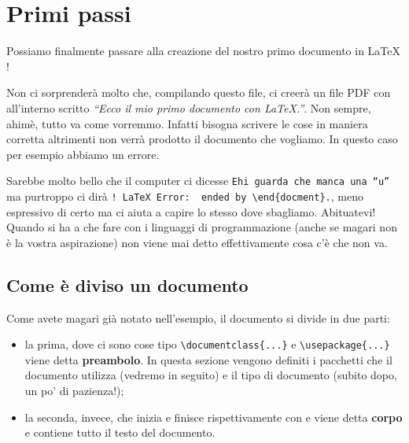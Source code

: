 \chapter{Primi passi}
Possiamo finalmente passare alla creazione del nostro primo documento in \LaTeX{}
!

Non ci sorprenderà molto che, compilando questo file, ci creerà un file PDF con 
all'interno scritto \textit{``Ecco il mio primo documento con \LaTeX{}.''}. Non 
sempre, ahimè, tutto va come vorremmo. Infatti bisogna scrivere le cose in 
maniera corretta altrimenti non verrà prodotto il documento che vogliamo. In 
questo caso per esempio abbiamo un errore.

Sarebbe molto bello che il computer ci dicesse \texttt{Ehi guarda che manca 
una ``u''} ma purtroppo ci dirà 
\verb|! LaTeX Error:  ended by \end{docment}.|, meno 
espressivo di certo ma ci aiuta a capire lo stesso dove sbagliamo. Abituatevi! 
Quando si ha a che fare con i linguaggi di programmazione (anche se magari non 
è la vostra aspirazione) non viene mai detto effettivamente cosa c'è che non 
va.

\section{Come è diviso un documento}
Come avete magari già notato nell'esempio, il documento si divide in due parti:
\begin{itemize}
    \item la prima, dove ci sono cose tipo \verb!\documentclass{...}! e 
    \verb!\usepackage{...}! viene detta \textbf{preambolo}. In questa sezione 
    vengono definiti i pacchetti che il documento utilizza (vedremo in 
    seguito) e il tipo di documento (subito dopo, un po' di pazienza!);
    \item la seconda, invece, che inizia e finisce rispettivamente con 
    \verb!! e \verb!! viene detta \textbf{corpo} 
    e contiene tutto il testo del documento.
\end{itemize}

